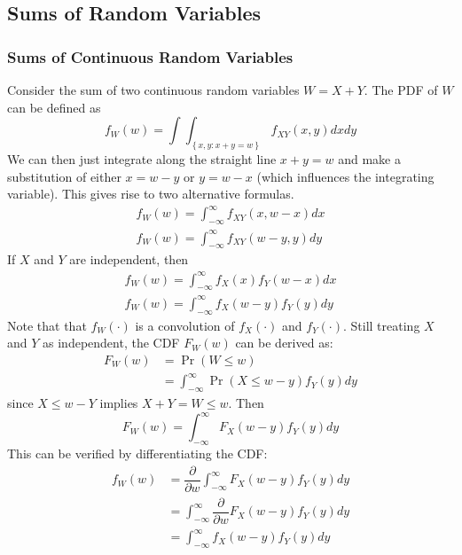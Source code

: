 \documentclass[11pt]{report} %
\begin{document}
\subsection{Sums of Random Variables}

\subsubsection{Sums of Continuous Random Variables}

Consider the sum of two continuous random variables $W = X + Y$. The PDF of $W$ can be defined as
\begin{equation}
f_{W}\left(w\right) = \int\int_{\left\{x,y: x + y = w\right\}}f_{XY}\left(x, y\right)dxdy
\end{equation}
We can then just integrate along the straight line $x + y = w$ and make a substitution of either $x = w - y$ or $y = w - x$ (which influences the integrating variable). This gives rise to two alternative formulas.
\begin{gather}
f_{W}\left(w\right) = \int_{-\infty}^{\infty}f_{XY}\left(x, w-x\right)dx \\
f_{W}\left(w\right) = \int_{-\infty}^{\infty}f_{XY}\left(w - y, y\right)dy
\end{gather}
If $X$ and $Y$ are independent, then
\begin{gather}
f_{W}\left(w\right) = \int_{-\infty}^{\infty}f_{X}\left(x\right)f_{Y}\left(w-x\right)dx \\
f_{W}\left(w\right) = \int_{-\infty}^{\infty}f_{X}\left(w - y\right)f_{Y}\left(y\right)dy
\end{gather}
Note that that $f_{W}\left(\cdot\right)$ is a convolution of $f_{X}\left(\cdot\right)$ and $f_{Y}\left(\cdot\right)$. Still treating $X$ and $Y$ as independent, the CDF $F_{W}\left(w\right)$ can be derived as:
\begin{align}
F_{W}\left(w\right) &= \operatorname{Pr}\left(W \leq w\right) \\
&= \int_{-\infty}^{\infty}\operatorname{Pr}\left(X \leq w - y\right)f_{Y}\left(y\right)dy
\end{align}
since $X \leq w - Y$ implies $X + Y = W \leq w$. Then
\begin{equation}
F_{W}\left(w\right) = \int_{-\infty}^{\infty}F_{X}\left(w - y\right)f_{Y}\left(y\right)dy
\end{equation}
This can be verified by differentiating the CDF:
\begin{align}
f_{W}\left(w\right) &= \dfrac{\partial}{\partial w}\int_{-\infty}^{\infty}F_{X}\left(w - y\right)f_{Y}\left(y\right)dy \\
&= \int_{-\infty}^{\infty}\dfrac{\partial}{\partial w}F_{X}\left(w - y\right)f_{Y}\left(y\right)dy \\
&= \int_{-\infty}^{\infty}f_{X}\left(w - y\right)f_{Y}\left(y\right)dy
\end{align}
\end{document}
